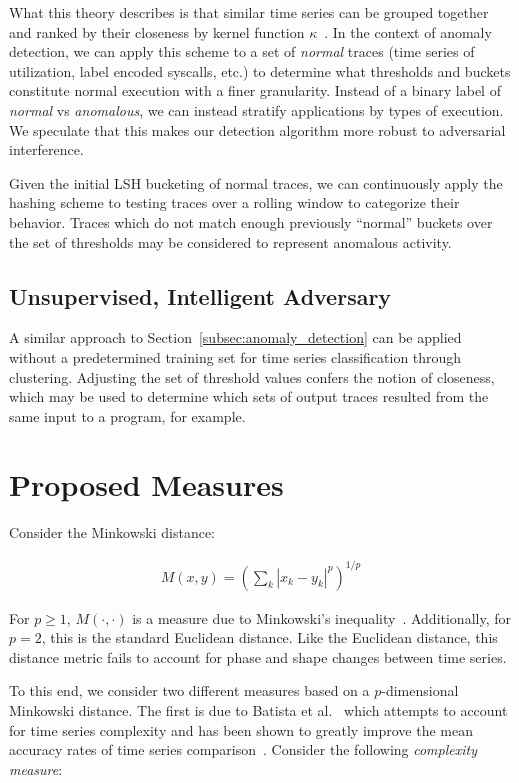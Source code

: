 \documentclass[a4paper]{article}
\begin{document}
What this theory describes is that similar time series can be grouped together and ranked by their closeness by kernel function $\kappa$~\cite{Hachiya13-NSH}.
In the context of anomaly detection, we can apply this scheme to a set of \textit{normal} traces (time series of utilization, label encoded syscalls, etc.) to determine what thresholds and buckets constitute normal execution with a finer granularity.
Instead of a binary label of \textit{normal} vs \textit{anomalous}, we can instead stratify applications by types of execution.
We speculate that this makes our detection algorithm more robust to adversarial interference.

Given the initial LSH bucketing of normal traces, we can continuously apply the hashing scheme to testing traces over a rolling window to categorize their behavior.
Traces which do not match enough previously ``normal'' buckets over the set of thresholds may be considered to represent anomalous activity.


\subsection{Unsupervised, Intelligent Adversary}

A similar approach to Section~\ref{subsec:anomaly_detection} can be applied without a predetermined training set for time series classification through clustering.
Adjusting the set of threshold values confers the notion of closeness, which may be used to determine which sets of output traces resulted from the same input to a program, for example.

\section{Proposed Measures}

Consider the Minkowski distance:

\begin{align*}
    M(x,y) = {(\sum\limits_k |x_k - y_k|^p)}^{1/p}
\end{align*}

For $p \ge 1$, $M(\cdot,\cdot)$ is a measure due to Minkowski's inequality~\cite[p. 190]{wheeden15-measure}.
Additionally, for $p = 2$, this is the standard Euclidean distance.
Like the Euclidean distance, this distance metric fails to account for phase and shape changes between time series.

To this end, we consider two different measures based on a $p$-dimensional Minkowski distance.
The first is due to Batista et al.~\cite{batista14-cid} which attempts to account for time series complexity and has been shown to greatly improve the mean accuracy rates of time series comparison~\cite{giusti13-ecd}.
Consider the following \textit{complexity measure}:
\end{document}
